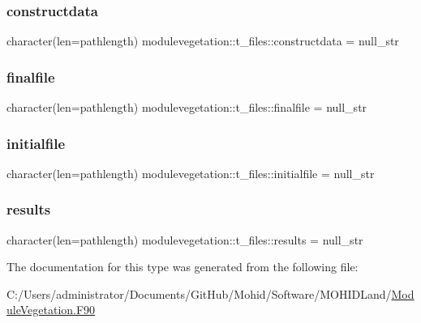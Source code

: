 \subsubsection{\texorpdfstring{constructdata}{constructdata}}
{\footnotesize\ttfamily character(len=pathlength) modulevegetation\+::t\+\_\+files\+::constructdata = null\+\_\+str\hspace{0.3cm}{\ttfamily [private]}}

\mbox{\label{structmodulevegetation_1_1t__files_aacc7faa6d5c034ef10475ed6238899b6}} 
\subsubsection{\texorpdfstring{finalfile}{finalfile}}
{\footnotesize\ttfamily character(len=pathlength) modulevegetation\+::t\+\_\+files\+::finalfile = null\+\_\+str\hspace{0.3cm}{\ttfamily [private]}}

\mbox{\label{structmodulevegetation_1_1t__files_aa3c3111fafd6cfd8fd9bbaf9c898bf02}} 
\subsubsection{\texorpdfstring{initialfile}{initialfile}}
{\footnotesize\ttfamily character(len=pathlength) modulevegetation\+::t\+\_\+files\+::initialfile = null\+\_\+str\hspace{0.3cm}{\ttfamily [private]}}

\mbox{\label{structmodulevegetation_1_1t__files_a5c281853bb86962134ee84a289aaa09e}} 
\subsubsection{\texorpdfstring{results}{results}}
{\footnotesize\ttfamily character(len=pathlength) modulevegetation\+::t\+\_\+files\+::results = null\+\_\+str\hspace{0.3cm}{\ttfamily [private]}}



The documentation for this type was generated from the following file\+:\begin{DoxyCompactItemize}
\item 
C\+:/\+Users/administrator/\+Documents/\+Git\+Hub/\+Mohid/\+Software/\+M\+O\+H\+I\+D\+Land/\mbox{\hyperlink{_module_vegetation_8_f90}{Module\+Vegetation.\+F90}}\end{DoxyCompactItemize}
